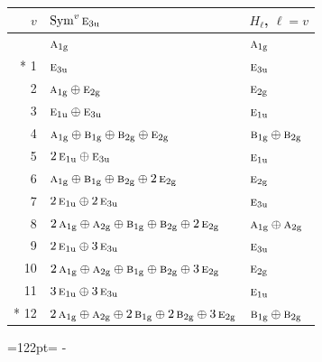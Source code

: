 \documentclass[10pt,a4paper]{article}
\newcommand{\needspace}[1]{\par\penalty-100\begingroup\dimen0=#1\relax\dimen2=\pagegoal
  \advance\dimen2-\pagetotal\ifdim\dimen0>\dimen2\relax\ifdim\dimen2>0pt\vfil\break\fi\fi
  \endgroup}
\numberwithin{equation}{section}
\newcommand{\irr}[1]{\text{\normalfont\scshape #1}}
\newcommand{\ptag}[1]{\mathrm{#1}}
\begin{document}
{\small\begin{longtable}{@{}rll@{}}\toprule
$v$ & $\operatorname{Sym}^{v}\irr{e}_{3\ptag{u}}$ & $H_\ell$, $\ell = v$\\\midrule\endhead
\bottomrule\endfoot\endlastfoot
0 & $\irr{a}_{1\ptag{g}}$ & $\irr{a}_{1\ptag{g}}$\\*
1 & $\irr{e}_{3\ptag{u}}$ & $\irr{e}_{3\ptag{u}}$\\
2 & $\irr{a}_{1\ptag{g}} \oplus \irr{e}_{2\ptag{g}}$ & $\irr{e}_{2\ptag{g}}$\\
3 & $\irr{e}_{1\ptag{u}} \oplus \irr{e}_{3\ptag{u}}$ & $\irr{e}_{1\ptag{u}}$\\
4 & $\irr{a}_{1\ptag{g}} \oplus \irr{b}_{1\ptag{g}} \oplus \irr{b}_{2\ptag{g}} \oplus \irr{e}_{2\ptag{g}}$ & $\irr{b}_{1\ptag{g}} \oplus \irr{b}_{2\ptag{g}}$\\
5 & $2\,\irr{e}_{1\ptag{u}} \oplus \irr{e}_{3\ptag{u}}$ & $\irr{e}_{1\ptag{u}}$\\
6 & $\irr{a}_{1\ptag{g}} \oplus \irr{b}_{1\ptag{g}} \oplus \irr{b}_{2\ptag{g}} \oplus 2\,\irr{e}_{2\ptag{g}}$ & $\irr{e}_{2\ptag{g}}$\\
7 & $2\,\irr{e}_{1\ptag{u}} \oplus 2\,\irr{e}_{3\ptag{u}}$ & $\irr{e}_{3\ptag{u}}$\\
8 & $2\,\irr{a}_{1\ptag{g}} \oplus \irr{a}_{2\ptag{g}} \oplus \irr{b}_{1\ptag{g}} \oplus \irr{b}_{2\ptag{g}} \oplus 2\,\irr{e}_{2\ptag{g}}$ & $\irr{a}_{1\ptag{g}} \oplus \irr{a}_{2\ptag{g}}$\\
9 & $2\,\irr{e}_{1\ptag{u}} \oplus 3\,\irr{e}_{3\ptag{u}}$ & $\irr{e}_{3\ptag{u}}$\\
10 & $2\,\irr{a}_{1\ptag{g}} \oplus \irr{a}_{2\ptag{g}} \oplus \irr{b}_{1\ptag{g}} \oplus \irr{b}_{2\ptag{g}} \oplus 3\,\irr{e}_{2\ptag{g}}$ & $\irr{e}_{2\ptag{g}}$\\
11 & $3\,\irr{e}_{1\ptag{u}} \oplus 3\,\irr{e}_{3\ptag{u}}$ & $\irr{e}_{1\ptag{u}}$\\*
12 & $2\,\irr{a}_{1\ptag{g}} \oplus \irr{a}_{2\ptag{g}} \oplus 2\,\irr{b}_{1\ptag{g}} \oplus 2\,\irr{b}_{2\ptag{g}} \oplus 3\,\irr{e}_{2\ptag{g}}$ & $\irr{b}_{1\ptag{g}} \oplus \irr{b}_{2\ptag{g}}$\\
\bottomrule\end{longtable}}
\needspace{122pt}
\end{document}

